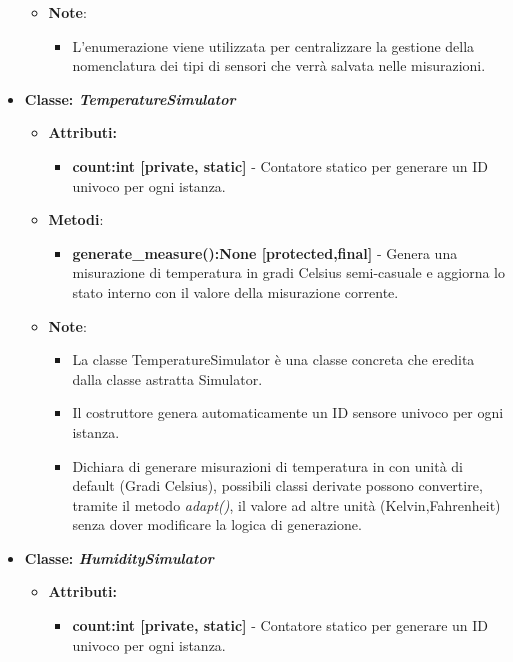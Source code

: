 \begin{itemize}
\begin{itemize}
            \item \textbf{Note}:
            \begin{itemize}
                \item L'enumerazione viene utilizzata per centralizzare la gestione della nomenclatura dei tipi di sensori che verrà salvata nelle misurazioni.
            \end{itemize}
        \end{itemize}
        
        
    \item{\textbf{Classe: \textit{TemperatureSimulator}}}
    \begin{itemize}
        \item \textbf{Attributi:}
    \begin{itemize}
        \item \textbf{count:int [private, static]} - Contatore statico per generare un ID univoco per ogni istanza.
    \end{itemize}
    \item\textbf{Metodi}: 
    \begin{itemize}
        \item \textbf{generate\_measure():None [protected,final]} - Genera una misurazione di temperatura in gradi Celsius semi-casuale e aggiorna lo stato interno con il valore della misurazione corrente.
    \end{itemize}
    \item\textbf{Note}:
    \begin{itemize}
        \item La classe TemperatureSimulator è una classe concreta che eredita dalla classe astratta Simulator.
        \item Il costruttore genera automaticamente un ID sensore univoco per ogni istanza.
        \item Dichiara di generare misurazioni di temperatura in con unità di default (Gradi Celsius), possibili classi derivate possono convertire, tramite il metodo \textit{adapt()}, il valore ad altre unità (Kelvin,Fahrenheit) senza dover modificare la logica di generazione.    \end{itemize}
\end{itemize}
    \item{\textbf{Classe: \textit{HumiditySimulator}}}
    \begin{itemize}
        \item\textbf{Attributi:}
    \begin{itemize}
        \item \textbf{count:int [private, static]} - Contatore statico per generare un ID univoco per ogni istanza.

\end{itemize}
\end{itemize}
\end{itemize}
